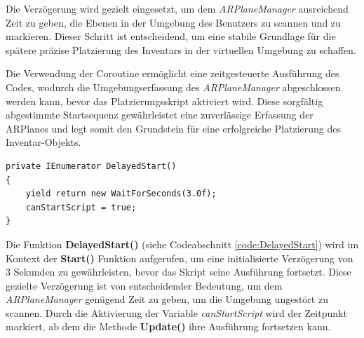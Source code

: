 Die Verzögerung wird gezielt eingesetzt, um dem \textit{ARPlaneManager} ausreichend Zeit zu geben, die Ebenen in der
Umgebung des Benutzers zu scannen und zu markieren. Dieser Schritt ist entscheidend, um eine stabile Grundlage für die
spätere präzise Platzierung des Inventars in der virtuellen Umgebung zu schaffen.

Die Verwendung der Coroutine ermöglicht eine zeitgesteuerte Ausführung des Codes, wodurch die Umgebungserfassung des
\textit{ARPlaneManager} abgeschlossen werden kann, bevor das Platzierungsskript aktiviert wird. Diese sorgfältig abgestimmte
Startsequenz gewährleistet eine zuverlässige Erfassung der ARPlanes und legt somit den Grundstein für eine erfolgreiche
Platzierung des Inventar-Objekts.\\

\begin{lstlisting}[style=csharp, caption={Verzoegerter Start}, label=code:DelayedStart]
private IEnumerator DelayedStart()
{
    yield return new WaitForSeconds(3.0f);
    canStartScript = true;
}
\end{lstlisting}
Die Funktion \textbf{DelayedStart()} (siehe Codeabschnitt \ref{code:DelayedStart}) wird im Kontext der \textbf{Start()}
Funktion aufgerufen, um eine initialisierte Verzögerung von 3 Sekunden zu gewährleisten, bevor das Skript seine Ausführung
fortsetzt. Diese gezielte Verzögerung ist von entscheidender Bedeutung, um dem \textit{ARPlaneManager} genügend Zeit zu
geben, um die Umgebung ungestört zu scannen. Durch die Aktivierung der Variable \textit{canStartScript} wird der Zeitpunkt
markiert, ab dem die Methode \textbf{Update()} ihre Ausführung fortsetzen kann.

